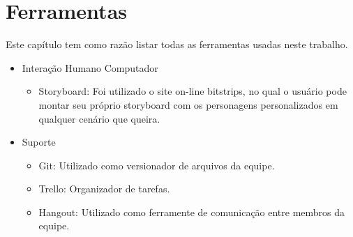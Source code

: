 \chapter[Ferramentas]{Ferramentas}

Este capítulo tem como razão listar todas as ferramentas usadas neste trabalho.

\begin{itemize}
	\item Interação Humano Computador
	\begin {itemize}
		\item Storyboard: Foi utilizado o site on-line bitstrips, no qual o usuário pode montar seu próprio storyboard com os personagens personalizados em qualquer cenário que queira.
	\end {itemize}
	
	\item Suporte
	\begin {itemize}
		\item Git: Utilizado como versionador de arquivos da equipe.
		\item Trello: Organizador de tarefas.
		\item Hangout: Utilizado como ferramente de comunicação entre membros da equipe.
	\end {itemize}
\end{itemize}

